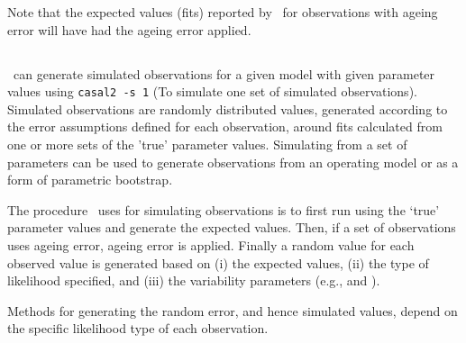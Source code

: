 {{{{Note that the expected values (fits) reported by \CNAME\ for observations with ageing error will have had the ageing error applied. 



\subsection{\label{sec:simulation-observations}}

\CNAME\ can generate simulated observations for a given model with given parameter values using \texttt{casal2 -s 1} (To simulate one set of simulated observations). Simulated observations are randomly distributed values, generated according to the error assumptions defined for each observation, around fits calculated from one or more sets of the 'true' parameter values. Simulating from a set of parameters can be used to generate observations from an operating model or as a form of parametric bootstrap. 

The procedure \CNAME\ uses for simulating observations is to first run using the `true' parameter values and generate the expected values. Then, if a set of observations uses ageing error, ageing error is applied. Finally a random value for each observed value is generated based on (i) the expected values, (ii) the type of likelihood specified, and (iii) the variability parameters (e.g.,  and ). 

Methods for generating the random error, and hence simulated values, depend on the specific likelihood type of each observation. 

}}}}
